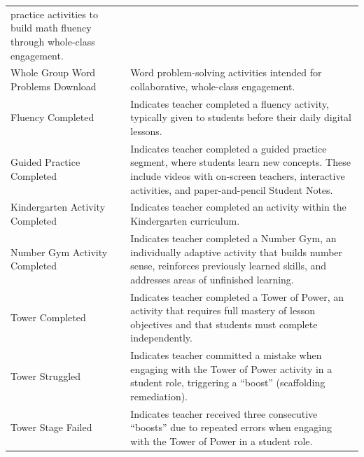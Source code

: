 \documentclass[
  number,
  preprint,
  3p,
  onecolumn]{elsarticle}
\begin{document}
\begin{longtable}[]{@{}
  >{\raggedright\arraybackslash}p{}
  >{\raggedright\arraybackslash}p{}@{}}
practice activities to build math fluency through whole-class
engagement. \\
Whole Group Word Problems Download \citep{zearn2024m} & Word
problem-solving activities intended for collaborative, whole-class
engagement. \\
Fluency Completed \citep{zearn2024q} & Indicates teacher completed a
fluency activity, typically given to students before their daily digital
lessons. \\
Guided Practice Completed \citep{zearn2024r} & Indicates teacher
completed a guided practice segment, where students learn new concepts.
These include videos with on-screen teachers, interactive activities,
and paper-and-pencil Student Notes. \\
Kindergarten Activity Completed \citep{zearn2024s} & Indicates teacher
completed an activity within the Kindergarten curriculum. \\
Number Gym Activity Completed \citep{zearn2024t} & Indicates teacher
completed a Number Gym, an individually adaptive activity that builds
number sense, reinforces previously learned skills, and addresses areas
of unfinished learning. \\
Tower Completed \citep{zearn2024b} & Indicates teacher completed a Tower
of Power, an activity that requires full mastery of lesson objectives
and that students must complete independently. \\
Tower Struggled \citep{zearn2024u} & Indicates teacher committed a
mistake when engaging with the Tower of Power activity in a student
role, triggering a ``boost'' (scaffolding remediation). \\
Tower Stage Failed \citep{zearn2024b} & Indicates teacher received three
consecutive ``boosts'' due to repeated errors when engaging with the
Tower of Power in a student role. \\
\end{longtable}

\newpage{}
\end{document}
